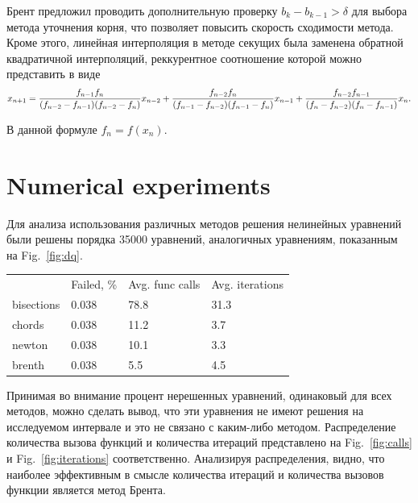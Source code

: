 \documentclass[
11pt,%
tightenlines,%
twoside,%
onecolumn,%
nofloats,%
nobibnotes,%
nofootinbib,%
superscriptaddress,%
noshowpacs,%
centertags]%
{revtex4}
\begin{document}
Брент предложил проводить дополнительную проверку $b_k-b_{k-1} > \delta$ для выбора метода уточнения корня, что позволяет повысить скорость сходимости метода. Кроме этого, линейная интерполяция в методе секущих была заменена обратной квадратичной интерполяций, реккурентное соотношение которой можно представить в виде
\begin{equation}
x_{n+1}=\frac{f_{n-1}f_n}{(f_{n-2}-f_{n-1})(f_{n-2}-f_n)}x_{n-2}+ \\\frac{f_{n-2}f_n}{(f_{n-1}-f_{n-2})(f_{n-1}-f_n)}x_{n-1}+\frac{f_{n-2}f_{n-1}}{(f_{n}-f_{n-2})(f_{n}-f_{n-1})}x_{n}.
\end{equation}

В данной формуле $f_n=f(x_n)$.

\section{Numerical experiments}

Для анализа использования различных методов решения нелинейных уравнений были решены порядка 35000 уравнений, аналогичных уравнениям, показанным на Fig.~\ref{fig:dq}.
\newpage

\begin{table}[ht!]
\begin{tabular}{llll}
           & Failed, \% & Avg. func calls & Avg. iterations \\
bisections & 0.038      & 78.8            & 31.3            \\
chords     & 0.038      & 11.2            & 3.7             \\
newton     & 0.038      & 10.1            & 3.3             \\
brenth     & 0.038      & 5.5             & 4.5            
\end{tabular}
\end{table}

Принимая во внимание процент нерешенных уравнений, одинаковый для всех методов, можно сделать вывод, что эти уравнения не имеют решения на исследуемом интервале и это не связано с каким-либо методом. Распределение количества вызова функций и количества итераций представлено на Fig.~\ref{fig:calls} и Fig.~\ref{fig:iterations} соответственно. Анализируя распределения, видно, что наиболее эффективным в смысле количества итераций и количества вызовов функции является метод Брента.
\end{document}
